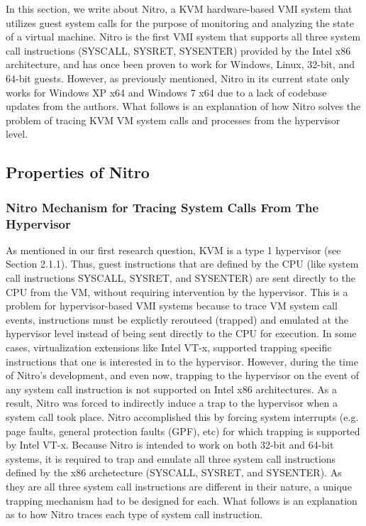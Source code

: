 \documentclass{report}
\begin{document}
\begin{spacing}{1.5}
{\large
In this section, we write about Nitro, a KVM hardware-based VMI system that utilizes guest system calls for the purpose of monitoring and analyzing the state of a virtual machine. Nitro is the first VMI system that supports all three system call instructions (SYSCALL, SYSRET, SYSENTER) provided by the Intel x86 architecture, and has once been proven to work for Windows, Linux, 32-bit, and 64-bit guests. However, as previously mentioned, Nitro in its current state only works for Windows XP x64 and Windows 7 x64 due to a lack of codebase updates from the authors. What follows is an explanation of how Nitro solves the problem of tracing KVM VM system calls and processes from the hypervisor level.
\newline
}



\subsection{Properties of Nitro}




\subsubsection{Nitro Mechanism for Tracing System Calls From The Hypervisor}

{\large
As mentioned in our first research question, KVM is a type 1 hypervisor (see Section 2.1.1). Thus, guest instructions that are defined by the CPU (like system call instructions SYSCALL, SYSRET, and SYSENTER) are sent directly to the CPU from the VM, without requiring intervention by the hypervisor. This is a problem for hypervisor-based VMI systems because to trace VM system call events, instructions must be explictly rerouteed (trapped) and emulated at the hypervisor level instead of being sent directly to the CPU for execution. In some cases, virtualization extensions like Intel VT-x, supported trapping specific instructions that one is interested in to the hypervisor. However, during the time of Nitro's development, and even now, trapping to the hypervisor on the event of any system call instruction is not supported on Intel x86 architectures. As a result, Nitro was forced to indirectly induce a trap to the hypervisor when a system call took place. Nitro accomplished this by forcing system interrupts (e.g. page faults, general protection faults (GPF), etc) for which trapping is supported by Intel VT-x. Because Nitro is intended to work on both 32-bit and 64-bit systems, it is required to trap and emulate all three system call instructions defined by the x86 archetecture (SYSCALL, SYSRET, and SYSENTER). As they are all three system call instructions are different in their nature, a unique trapping mechanism had to be designed for each. What follows is an explanation as to how Nitro traces each type of system call instruction.
\leavevmode\newline
}



\end{spacing}
\end{document}
